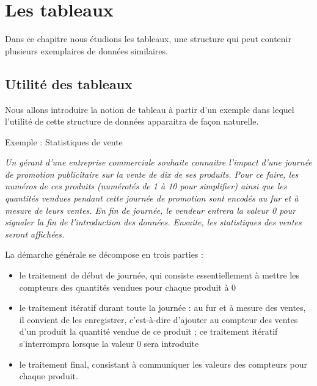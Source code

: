 \chapter{Les tableaux}

	Dans ce chapitre nous étudions les tableaux, 
	une structure qui peut contenir 
	plusieurs exemplaires de données similaires.

\section{Utilité des tableaux}

	Nous allons introduire la notion de tableau à partir d’un exemple 
	dans lequel l’utilité de cette structure de données 
	apparaitra de façon naturelle.

	\begin{Emphase}{Exemple : Statistiques de vente}

		{\itshape
		Un gérant d’une entreprise commerciale souhaite connaitre l’impact d’une
		journée de promotion publicitaire sur la vente de dix de ses produits.
		Pour ce faire, les numéros de ces produits (numérotés de 1 à 10 pour
		simplifier) ainsi que les quantités vendues pendant cette journée de
		promotion sont encodés au fur et à mesure de leurs ventes. En fin de
		journée, le vendeur entrera la valeur 0 pour signaler la fin de
		l’introduction des données. Ensuite, les statistiques des ventes seront
		affichées.}

	\end{Emphase}

	La démarche générale se décompose en trois parties :

	\begin{itemize}
	\item {
		le traitement de début de journée, qui consiste essentiellement à mettre
		les compteurs des quantités vendues pour chaque produit à 0}
		\item {
		le traitement itératif durant toute la journée : au fur et à mesure des
		ventes, il convient de les enregistrer, c’est-à-dire d’ajouter au
		compteur des ventes d’un produit la quantité vendue de ce produit ; ce
		traitement itératif s’interrompra lorsque la valeur 0 sera introduite}
	\item {
		le traitement final, consistant à communiquer les valeurs des compteurs
		pour chaque produit.}
	\end{itemize}

